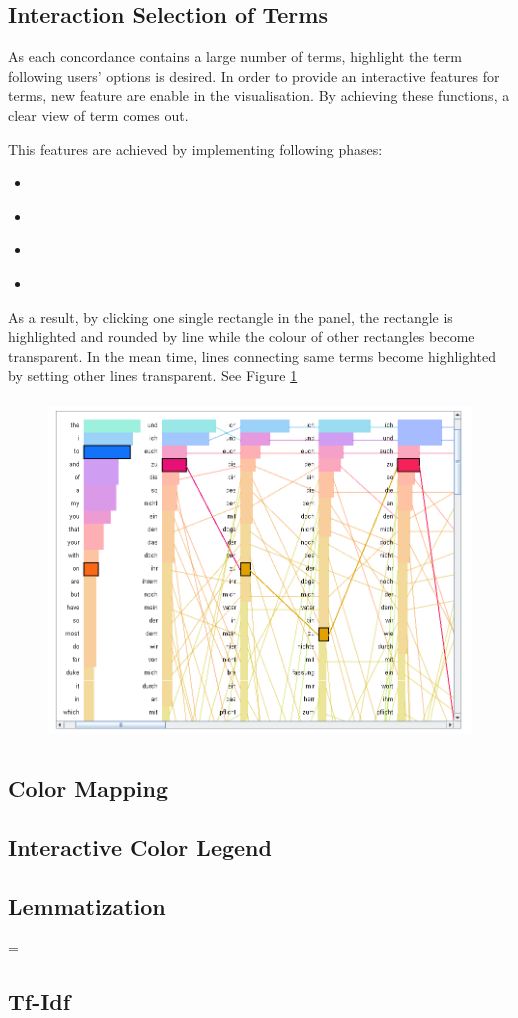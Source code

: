 \subsection{Interaction Selection of Terms}

As each concordance contains a large number of terms, highlight the term following users' options is desired. In order to provide an interactive features for terms, new feature are enable in the visualisation. By achieving these functions, a clear view of term comes out. 

This features are achieved by implementing following phases:
\begin{itemize}
	\item \textbf{}
	\item \textbf{}
	\item \textbf{}
	\item \textbf{}
\end{itemize}

As a result, by clicking one single rectangle in the panel, the rectangle is highlighted and rounded by line while the colour of other rectangles become transparent. In the mean time, lines connecting same terms become highlighted by setting other lines transparent. See Figure \ref{fig:highlightView}

\begin{figure}[h]
	\centering	
	\includegraphics[width=16cm, height=9cm]{Figs/Highlight-Terms}\\[1ex]
	\caption{}
	\label{fig:highlightView}
\end{figure} 

\subsection{Color Mapping}



\subsection{Interactive Color Legend}

\subsection{Lemmatization}
=
\subsection{Tf-Idf}

\subsection{}



